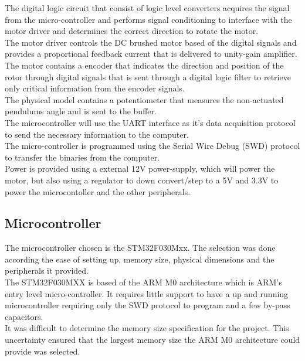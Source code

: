 The digital logic circuit that consist of logic level converters acquires the signal from the micro-controller and performs signal conditioning to interface with the motor driver and determines the correct direction to rotate the motor. \\

The motor driver controls the DC brushed motor based of the digital signals and provides a proportional feedback current that is delivered to unity-gain amplifier.\\

The motor contains a encoder that indicates the direction and position of the rotor through digital signals that is sent through a digital logic filter to retrieve only critical information from the encoder signals. \\

The physical model contains a potentiometer that measures the non-actuated pendulums angle and is sent to the buffer.\\

The microcontroller will use the UART interface as it's data acquisition protocol to send the necessary information to the computer. \\

The micro-controller is programmed using the Serial Wire Debug (SWD) protocol to transfer the binaries from the computer.\\

Power is provided using a external 12V power-supply, which will power the motor, but also using a regulator to down convert/step to a 5V and 3.3V to power the microcontoller and the other peripherals.


\subsection{Microcontroller}
The microcontroller chosen is the STM32F030Mxx. The selection was done according the ease of setting up, memory size, physical dimensions and the peripherals it provided.\\

The STM32F030MXX is based of the ARM M0 architecture which is ARM's entry level micro-controller. It requires little support to have a up and running microcontroller requiring only the SWD protocol to program and a few by-pass capacitors.\\

It was difficult to determine the memory size specification for the project. This uncertainty ensured that the largest memory size the ARM M0 architecture could provide was selected.\\

